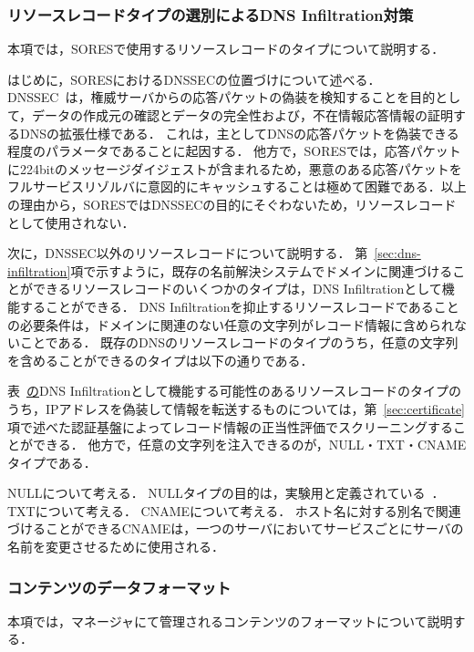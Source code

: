\subsubsection{リソースレコードタイプの選別によるDNS Infiltration対策}
本項では，SORESで使用するリソースレコードのタイプについて説明する．

はじめに，SORESにおけるDNSSECの位置づけについて述べる．
DNSSEC~\cite{rfc4033}は，権威サーバからの応答パケットの偽装を検知することを目的として，データの作成元の確認とデータの完全性および，不在情報応答情報の証明するDNSの拡張仕様である．
これは，主としてDNSの応答パケットを偽装できる程度のパラメータであることに起因する．
他方で，SORESでは，応答パケットに224bitのメッセージダイジェストが含まれるため，悪意のある応答パケットをフルサービスリゾルバに意図的にキャッシュすることは極めて困難である．以上の理由から，SORESではDNSSECの目的にそぐわないため，リソースレコードとして使用されない．

次に，DNSSEC以外のリソースレコードについて説明する．
第~\ref{sec:dns-infiltration}項で示すように，既存の名前解決システムでドメインに関連づけることができるリソースレコードのいくつかのタイプは，DNS Infiltrationとして機能することができる．
DNS Infiltrationを抑止するリソースレコードであることの必要条件は，ドメインに関連のない任意の文字列がレコード情報に含められないことである．
既存のDNSのリソースレコードのタイプのうち，任意の文字列を含めることができるのタイプは以下の通りである．


表~\href{tab:infil-rtype}のDNS Infiltrationとして機能する可能性のあるリソースレコードのタイプのうち，IPアドレスを偽装して情報を転送するものについては，第~\ref{sec:certificate}項で述べた認証基盤によってレコード情報の正当性評価でスクリーニングすることができる．
他方で，任意の文字列を注入できるのが，NULL・TXT・CNAMEタイプである．

NULLについて考える．
NULLタイプの目的は，実験用と定義されている~\cite{rfc1035}．
TXTについて考える．
CNAMEについて考える．
ホスト名に対する別名で関連づけることができるCNAMEは，一つのサーバにおいてサービスごとにサーバの名前を変更させるために使用される．


\subsubsection{コンテンツのデータフォーマット}
本項では，マネージャにて管理されるコンテンツのフォーマットについて説明する．

